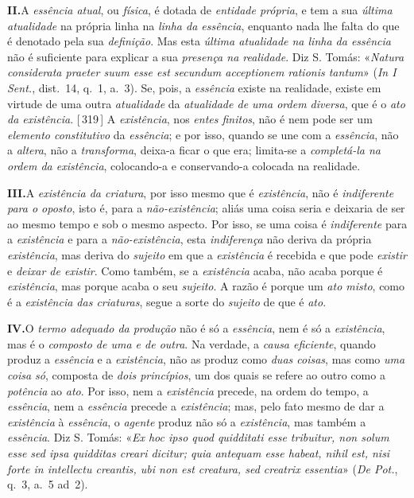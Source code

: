 \documentclass[12pt,a4paper]{article}
\newcommand{\pg}[1]{\thinspace\textup{[\,#1\,]}\thinspace}
\begin{document}
\medskip
\noindent\textbf{II.}\quad A \emph{essência atual}, ou \emph{física}, é dotada
de \emph{entidade própria}, e tem a sua \emph{última atualidade} na própria
linha \textemdash{} na \emph{linha da essência}, enquanto nada lhe falta do que
é denotado pela sua \emph{definição}. Mas esta \emph{última atualidade na linha
da essência} não é suficiente para explicar a sua \emph{presença na realidade}.
Diz S. Tomás: «\textit{Natura considerata praeter suum esse est secundum
acceptionem rationis tantum}» (\emph{In I Sent.}, dist.~14, q.~1, a.~3). Se,
pois, a \emph{essência} existe na realidade, existe em virtude de uma outra
\emph{atualidade} \textemdash{} da \emph{atualidade de uma ordem diversa}, que
é o \emph{ato da existência}. \pg{319} \textemdash{} A \emph{existência}, nos
\emph{entes finitos}, não é nem pode ser um \emph{elemento constitutivo} da
\emph{essência}; e por isso, quando se une com a \emph{essência}, não a
\emph{altera}, não a \emph{transforma}, deixa-a ficar o que era; limita-se a
\emph{completá-la na ordem da existência}, colocando-a e conservando-a colocada
na realidade.

\medskip
\noindent\textbf{III.}\quad A \emph{existência da criatura}, por isso mesmo que
é \emph{existência}, não é \emph{indiferente para o oposto}, isto é, para a
\emph{não-existência}; aliás uma coisa seria e deixaria de ser ao mesmo tempo e
sob o mesmo aspecto. Por isso, se uma coisa é \emph{indiferente} para a
\emph{existência} e para a \emph{não-existência}, esta \emph{indiferença} não
deriva da própria \emph{existência}, mas deriva do \emph{sujeito} em que a
\emph{existência} é recebida e que pode \emph{existir} e \emph{deixar de
existir}. \textemdash{} Como também, se a \emph{existência} acaba, não acaba
porque é \emph{existência}, mas porque acaba o seu \emph{sujeito}. A razão é
porque um \emph{ato misto}, como é a \emph{existência das criaturas}, segue a
sorte do \emph{sujeito} de que é \emph{ato}.

\medskip
\noindent\textbf{IV.}\quad O \emph{termo adequado da produção} não é só a
\emph{essência}, nem é só a \emph{existência}, mas é o \emph{composto de uma e
de outra}. Na verdade, a \emph{causa eficiente}, quando produz a \emph{essência}
e a \emph{existência}, não as produz como \emph{duas coisas}, mas como \emph{uma
coisa só}, composta de \emph{dois princípios}, um dos quais se refere ao outro
como a \emph{potência} ao \emph{ato}. \textemdash{} Por isso, nem a
\emph{existência} precede, na ordem do tempo, a \emph{essência}, nem a
\emph{essência} precede a \emph{existência}; mas, pelo fato mesmo de dar a
\emph{existência} à \emph{essência}, o \emph{agente} produz não só a
\emph{existência}, mas também a \emph{essência}. Diz S. Tomás: «\textit{Ex hoc
ipso quod quidditati esse tribuitur, non solum esse sed ipsa quidditas creari
dicitur; quia antequam esse habeat, nihil est, nisi forte in intellectu
creantis, ubi non est creatura, sed creatrix essentia}» (\emph{De Pot.}, q.~3,
a.~5 ad~2).
\end{document}
